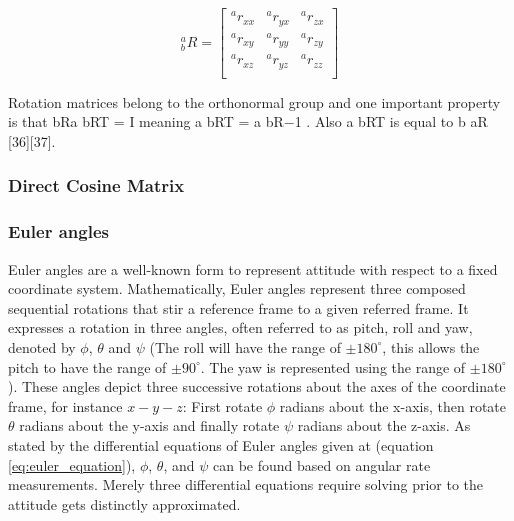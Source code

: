 \begin{equation}
    \textrm{$_{b}^{a}R$}
    =
    \begin{bmatrix}
        \textrm{$^{a}r_{xx}$} & \textrm{$^{a}r_{yx}$} & \textrm{$^{a}r_{zx}$} \\
        \textrm{$^{a}r_{xy}$} & \textrm{$^{a}r_{yy}$} & \textrm{$^{a}r_{zy}$} \\
        \textrm{$^{a}r_{xz}$} & \textrm{$^{a}r_{yz}$} & \textrm{$^{a}r_{zz}$} \\
    \end{bmatrix}
    \label{eq:axes_frames}
\end{equation}

Rotation matrices belong to the orthonormal group and one important property is that bRa bRT = I meaning a bRT = a bR−1 . Also a bRT is equal to b aR [36][37].

\subsubsection{Direct Cosine Matrix}

\subsubsection{Euler angles}

Euler angles are a well-known form to represent attitude with respect to a fixed coordinate system. Mathematically, Euler angles represent three composed sequential rotations that stir a reference frame to a given referred frame. It expresses a rotation in three angles, often referred to as pitch, roll and yaw, denoted by $\phi$, $\theta$ and $\psi$ (The roll will have the range of $\pm180^\circ$, this allows the pitch to have the range of $\pm90^{\circ}$. The yaw is represented using the range of $\pm180^{\circ}$). These angles depict three successive rotations about the axes of the coordinate frame, for instance $x-y-z$: First rotate $\phi$ radians about the x-axis, then rotate $\theta$ radians about the y-axis and finally rotate $\psi$ radians about the z-axis. As stated by the differential equations of Euler angles given at (equation \ref{eq:euler_equation}), $\phi$, $\theta$, and $\psi$ can be found based on angular rate measurements. Merely three differential equations require solving prior to the attitude gets distinctly approximated.

